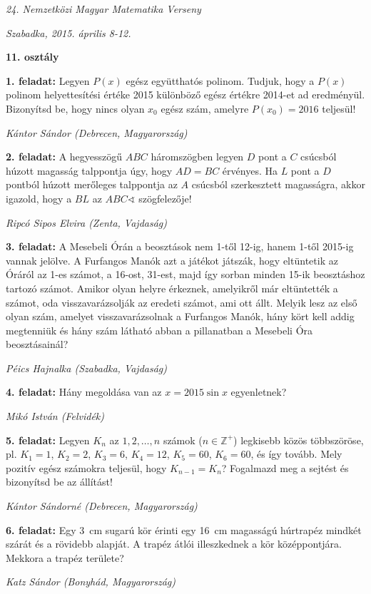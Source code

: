 \documentclass[a4paper,10pt]{article}
\newcommand{\ki}[2]{\hfill {\it #1 (#2)}\medskip}
\begin{document}
\begin{center} \Large {\em 24. Nemzetközi Magyar Matematika Verseny} \end{center}
\begin{center} \large{\em Szabadka, 2015. április 8-12.} \end{center}
\smallskip
\begin{center} \large{\bf 11. osztály} \end{center}
\bigskip 

{\bf 1. feladat: } Legyen $P(x)$ egész együtthatós polinom. Tudjuk, hogy a $P(x)$ polinom helyettesítési értéke 2015 különböző egész értékre 2014-et ad eredményül. Bizonyítsd be, hogy nincs olyan $x_0$ egész szám, amelyre $P(x_0)=2016$ teljesül!

\ki{Kántor Sándor}{Debrecen, Magyarország}\medskip

{\bf 2. feladat: } A hegyesszögű $ABC$ háromszögben legyen $D$ pont a $C$ csúcsból húzott magasság talppontja úgy, hogy $AD=BC$ érvényes. Ha $L$ pont a $D$ pontból húzott merőleges talppontja az $A$ csúcsból szerkesztett magasságra, akkor igazold, hogy a $BL$ az $ABC\sphericalangle$ szögfelezője!

\ki{Ripcó Sipos Elvira}{Zenta, Vajdaság}\medskip

{\bf 3. feladat: } A Mesebeli Órán a beosztások nem 1-től 12-ig, hanem 1-től 2015-ig vannak jelölve. A Furfangos Manók azt a játékot játszák, hogy eltüntetik az Óráról az 1-es számot, a 16-ost, 31-est, majd így sorban minden 15-ik beosztáshoz tartozó számot. Amikor olyan helyre érkeznek, amelyikről már eltüntették a számot, oda visszavarázsolják az eredeti számot, ami ott állt. Melyik lesz az első olyan szám, amelyet visszavarázsolnak a Furfangos Manók, hány kört kell addig megtenniük és hány szám látható abban a pillanatban a Mesebeli Óra beosztásainál? 

\ki{Péics Hajnalka}{Szabadka, Vajdaság}\medskip

{\bf 4. feladat: } Hány megoldása van az $x=2015\sin x$ egyenletnek?


\ki{Mikó István}{Felvidék}\medskip

{\bf 5. feladat: }  Legyen $K_n$ az $1,2,\ldots,n$ számok ($n\in\mathbb{Z}^+$) legkisebb közös többszöröse, pl. $K_1=1$, $K_2=2$, $K_3=6$, $K_4=12$, $K_5=60$, $K_6=60$, és így tovább. Mely pozitív egész számokra teljesül, hogy $K_{n-1}=K_n$? Fogalmazd meg a sejtést és bizonyítsd be az állítást!			

\ki{Kántor Sándorné}{Debrecen, Magyarország}\medskip

{\bf 6. feladat: } Egy 3~cm sugarú kör érinti egy 16~cm magasságú húrtrapéz mindkét szárát és a rövidebb alapját. A trapéz átlói illeszkednek a kör középpontjára. Mekkora a trapéz területe?

\ki{Katz Sándor}{Bonyhád, Magyarország}\medskip
\end{document}

